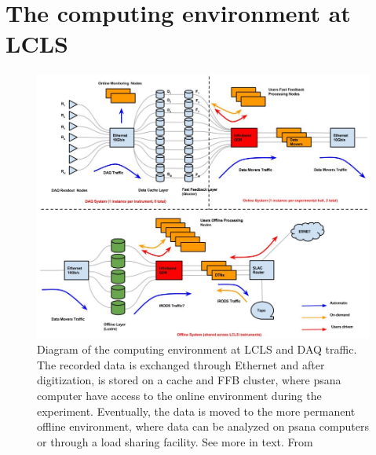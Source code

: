 \section{The computing environment at LCLS}\label{sec:LCLS-computing}
\begin{figure}
	\centering
		\includegraphics[width=1.00\textwidth]{images/daq-architecture.JPG}
	\caption[Diagram of the computing environment at LCLS and DAQ traffic.]{Diagram of the computing environment at LCLS and DAQ traffic. The recorded data is exchanged through Ethernet and after digitization, is stored on a cache and FFB cluster, where psana computer have access to the online environment during the experiment. Eventually, the data is moved to the more permanent offline environment, where data can be analyzed on psana computers or through a load sharing facility. See more in text. From \citep{Amadeo-2016-SLAC}}
	\label{fig:daq-architecture}
\end{figure}
